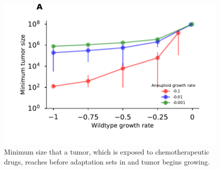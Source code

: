 \documentclass[12pt]{extarticle}
\begin{document}
\begin{appendices}
\begin{figure}[!htb]
 \vspace*{1\baselineskip}
\includegraphics[width=1\textwidth]{Figures/ThresholdPopulationSize.pdf}
\caption{Minimum size that a tumor, which is exposed to chemotherapeutic drugs, reaches before adaptation sets in and tumor begins growing.
}
\label{MinTumorSize}
\end{figure}



\end{appendices}

\end{document}
